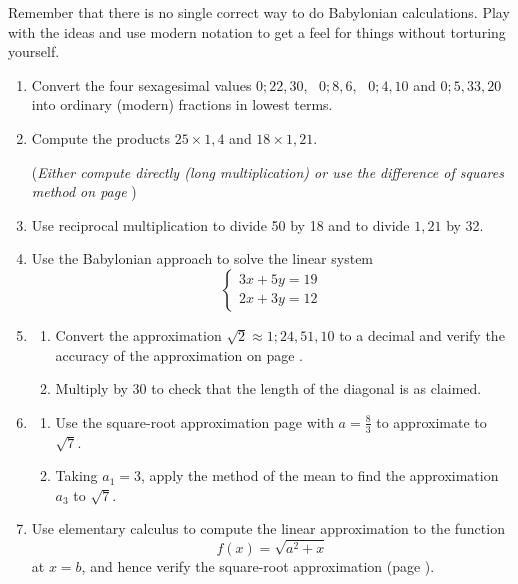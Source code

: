 \begin{exercises*}{}{}
	Remember that there is no single correct way to do Babylonian calculations. Play with the ideas and use modern  notation to get a feel for things without torturing yourself.
	
	\begin{enumerate}
	  \item %
	  Convert the four sexagesimal values $0;22,30$, \ $0;8,6$, \ $0;4,10$ and $0;5,33,20$ into ordinary (modern) fractions in lowest terms.
	  
	  
	  \item Compute the products $25\times 1,4$ and $18\times 1,21$.\par
	  (\emph{Either compute directly (long multiplication) or use the difference of squares method on page \pageref{babmult}})
	  
	  
	  \item Use reciprocal multiplication to divide 50 by 18 and to divide $1,21$ by 32.
	
	
		\item Use the Babylonian approach to solve the linear system
		\[
			\begin{cases}
				3x+5y=19\\
				2x+3y=12
			\end{cases}
		\]
	  
	  
	  \item%
	  \begin{enumerate}
	    \item Convert the approximation $\sqrt 2\approx 1;24,51,10$ to a decimal and verify the accuracy of the approximation on page \pageref{ybc7289}.
	    \item Multiply by 30 to check that the length of the diagonal is as claimed.
	  \end{enumerate}
	  
	  
	  \item\begin{enumerate}
	    \item Use the square-root approximation page \pageref{babroot} with $a=\frac 83$ to approximate to $\sqrt 7$.
	    \item Taking $a_1=3$, apply the method of the mean to find the approximation $a_3$ to $\sqrt 7$.
	  \end{enumerate}
	  
	 
		\item\label{exs:bablinapprox} Use elementary calculus to compute the linear approximation to the function
		\[
			f(x)=\sqrt{a^2+x}
		\]
		at $x=b$, and hence verify the square-root approximation (page \pageref{babroot}).
	  

\end{enumerate}
\end{exercises*}
